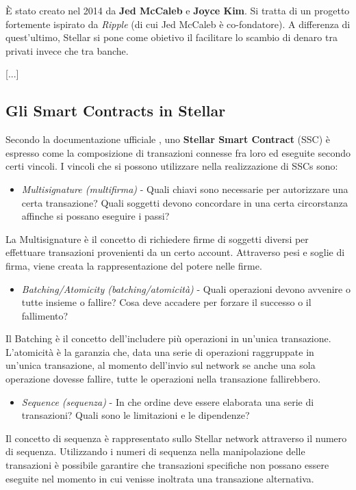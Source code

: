 È stato creato nel 2014 da \textbf{Jed McCaleb} e \textbf{Joyce Kim}.
Si tratta di un progetto fortemente ispirato da \textit{Ripple} (di cui Jed McCaleb
è co-fondatore). A differenza di quest'ultimo, Stellar si pone come obietivo
il facilitare lo scambio di denaro tra privati invece che tra banche.

[...]


\subsection{Gli Smart Contracts in Stellar}
\label{subsec:stellar smart contracts}

Secondo la documentazione ufficiale \cite{stellar-doc-sc},
uno \textbf{Stellar Smart Contract} (SSC) è espresso come la composizione
di transazioni connesse fra loro ed eseguite secondo certi vincoli.
I vincoli che si possono utilizzare nella realizzazione di SSCs sono:

\begin{itemize}
	\item \textit{Multisignature (multifirma)} - Quali chiavi sono necessarie
	      per autorizzare
	      una certa transazione? Quali soggetti devono concordare in una certa
	      circorstanza affinche si possano eseguire i passi?
\end{itemize}
La Multisignature è il concetto di richiedere firme di soggetti diversi per
effettuare transazioni provenienti da un certo account.
Attraverso pesi e soglie di firma,
viene creata la rappresentazione del potere nelle firme.

\begin{itemize}
	\item \textit{Batching/Atomicity (batching/atomicità)} -
	      Quali operazioni devono avvenire
	      o tutte insieme o fallire?
	      Cosa deve accadere per forzare il successo o il fallimento?
\end{itemize}
Il Batching è il concetto dell'includere più operazioni in un'unica transazione.
L'atomicità è la garanzia che, data una serie di operazioni raggruppate in
un'unica transazione,
al momento dell'invio sul network se anche una sola operazione dovesse fallire,
tutte le operazioni nella transazione fallirebbero.

\begin{itemize}
	\item \textit{Sequence (sequenza)} -
	      In che ordine deve essere elaborata una serie di transazioni?
	      Quali sono le limitazioni e le dipendenze?
\end{itemize}
Il concetto di sequenza è rappresentato sullo Stellar network attraverso
il numero di sequenza. Utilizzando i numeri di sequenza
nella manipolazione delle transazioni è possibile garantire che
transazioni specifiche non possano essere eseguite
nel momento in cui venisse inoltrata una transazione alternativa.

